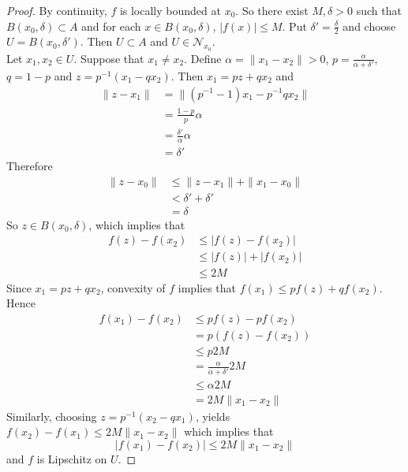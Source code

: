 \documentclass[12pt]{amsart}
\theoremstyle{definition}
\newcommand{\al}{\alpha}
\newcommand{\del}{\delta}
\newcommand{\MN}{\mathcal{N}}
\begin{document}
	\begin{proof}
	By continuity, $f$ is locally bounded at $x_0$. So there exist $M, \del >0$ such that $B(x_0, \del) \subset A$ and for each $x \in B(x_0, \del)$, $|f(x)| \leq M$. Put $\del' = \frac{\del}{2}$ and choose $U = B(x_0, \del')$. Then $U \subset A$ and $U \in \MN_{x_0}$. \\
	Let $x_1, x_2 \in U$. Suppose that $x_1 \neq x_2$. Define $\al = \|x_1 - x_2\| >0$, $p = \frac{\al}{\al + \del'}$, $q = 1-p$ and $z = p^{-1}(x_1 - qx_2)$. Then $x_1 = pz + qx_2$ and 
	\begin{align*}
	\|z - x_1\| 
	&= \|(p^{-1} - 1)x_1 - p^{-1}qx_2\| \\
	&= \frac{1-p}{p} \al \\
	&= \frac{\del'}{\al} \al \\
	&= \del ' 
	\end{align*}
	Therefore 
	\begin{align*}
	\|z - x_0\| 
	& \leq \|z - x_1\| + \|x_1 - x_0\| \\
	& <  \del '  + \del '  \\
	&= \del
\end{align*}	  
	So $z \in B(x_0, \del)$, which implies that 
	\begin{align*}
	f(z) - f(x_2) 
	& \leq |f(z) - f(x_2)|\\ 
	&\leq |f(z)| + |f(x_2)| \\
	&\leq 2M
\end{align*}		
	Since $x_1 = pz + qx_2$, convexity of $f$ implies that $f(x_1) \leq pf(z) + qf(x_2)$. Hence 
	\begin{align*}
	f(x_1) - f(x_2) 
	& \leq pf(z) -pf(x_2) \\
	&= p(f(z) - f(x_2)) \\
	& \leq p 2M \\
	&= \frac{\al}{\al + \del'} 2M \\
	& \leq \al 2M \\
	&= 2M \|x_1 - x_2 \|
	\end{align*}
	Similarly, choosing $z = p^{-1}(x_2 - qx_1)$, yields $f(x_2) - f(x_1) \leq 2M \|x_1 - x_2 \|$ which implies that $$|f(x_1) - f(x_2)| \leq 2M \|x_1 - x_2 \|$$ and $f$ is Lipschitz on $U$. 
 	\end{proof}


	
	
	
	
	
	
	
	
	
	
\end{document}
